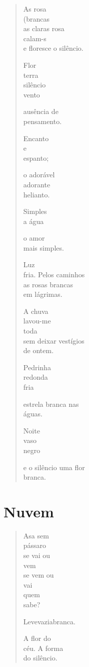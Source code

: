\begin{verse}
As rosa\\
(brancas\\
as claras rosa\\
calam-s\\
e floresce o silêncio.

Flor\\
terra\\
silêncio\\
vento

ausência de\\
pensamento.

Encanto\\
e\\
espanto;

o adorável\\
adorante\\
helianto.

Simples\\
a água

o amor\\
mais simples.

Luz\\
fria. Pelos caminhos\\
as rosas brancas\\
em lágrimas.

A chuva\\
lavou-me\\
toda\\
sem deixar vestígios\\
de ontem.

Pedrinha\\
redonda\\
fria

estrela branca nas\\
águas.

Noite\\
vaso\\
negro

e o silêncio uma flor\\
branca.
\end{verse}

\chapter{Nuvem}

\begin{verse}
Asa sem\\
pássaro\\
se vai ou\\
vem\\
se vem ou\\
\quad vai\\
\quad quem\\
\quad sabe?

Leve\quad vazia\quad branca.

A flor do\\
céu. A forma\\
do silêncio.
\end{verse}

